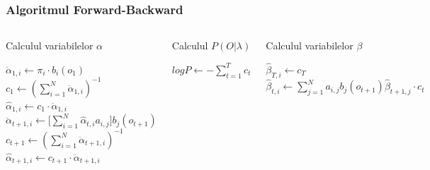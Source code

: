 \begin{frame}[fragile]
  \frametitle{Algoritmul Forward-Backward} \vspace*{-1em}
  \begin{columns}[T]
    \begin{algorithm}[H]
      \scriptsize
      \caption{Calculul variabilelor $\alpha$}
      \label{alg1}
       
      \begin{algorithmic}[2]
         \STATE $\ddot{\alpha}_{1,i} \leftarrow
        \pi_i \cdot b_i(o_1)$
        \ENDFOR
        \STATE $c_1 \leftarrow (\displaystyle\sum_{i=1}^{N}
        \ddot{\alpha}_{1,i})^{-1}$  \STATE
        $\hat{\alpha}_{1,i} \leftarrow c_1 \cdot \ddot{\alpha}_{1,i}$
        \ENDFOR
          \STATE
        $\ddot{\alpha}_{t+1,i} \leftarrow \Big[
        \displaystyle\sum_{i=1}^{N}\hat{\alpha}_{t,i}a_{i,j}\Big]
        b_{j}(o_{t+1})$
        \ENDFOR
        \STATE $c_{t+1} \leftarrow (\displaystyle\sum_{i=1}^{N}
        \ddot{\alpha}_{t+1,i})^{-1}$  \STATE
        $\hat{\alpha}_{t+1,i} \leftarrow c_{t+1} \cdot
        \ddot{\alpha}_{t+1,i}$
        \ENDFOR
        \ENDFOR
      \end{algorithmic}
    \end{algorithm}
    \begin{algorithm}[H]
      \scriptsize
      \caption{Calculul $P(O \vert \lambda)$}
      \label{alg2}
       
      \begin{algorithmic}[2]
        \STATE $logP \leftarrow -\displaystyle\sum_{t=1}^{T}c_t$
      \end{algorithmic}
    \end{algorithm}
    \vspace*{1em}
    \begin{algorithm}[H]
      \scriptsize
      \caption{Calculul variabilelor $\beta$}
      \label{alg3}
       
      \begin{algorithmic}[2]
         \STATE $\hat{\beta}_{T,i} \leftarrow c_T$
        \ENDFOR
          \STATE
        $\hat{\beta}_{t,i} \leftarrow \displaystyle\sum_{j=1}^{N}
        a_{i,j} b_{j}(o_{t+1}) \hat{\beta}_{t+1,j} \cdot c_t$
        \ENDFOR
        \ENDFOR
      \end{algorithmic}
    \end{algorithm}
  \end{columns}
\end{frame}

